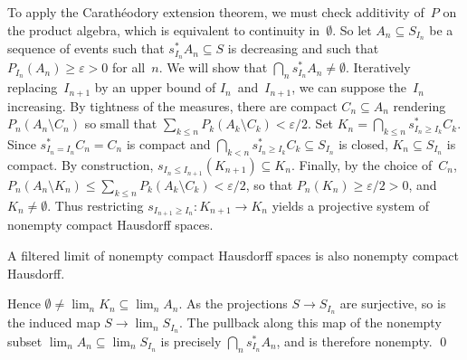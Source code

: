 To apply the Carathéodory extension theorem,
we must check \sig additivity of~$P$ on the product algebra,
which is equivalent to continuity in~$\emptyset$.
So let \( A_n \subseteq S_{I_n} \) be a sequence of events
such that \( s_{I_n}^* A_n \subseteq S \) is decreasing
and such that \( P_{I_n}(A_n) \ge \varepsilon > 0 \) for all~$n$.
We will show that \( \bigcap_n s_{I_n}^* A_n \ne \emptyset \).
Iteratively replacing~$I_{n+1}$ by an upper bound of $I_n$~and~$I_{n+1}$,
we can suppose the~$I_n$ increasing.
By tightness of the measures, there are compact \( C_n \subseteq A_n \)
rendering \( P_n(A_n \setminus C_n) \) so small that
\( \sum_{k \le n} P_k(A_k \setminus C_k) < \varepsilon/2 \).
Set \( K_n = \bigcap_{k \le n} s_{I_n \ge I_k}^* C_k \).
Since \( s_{I_n = I_n}^* C_n = C_n \) is compact
and \( \bigcap_{k < n} s_{I_n \ge I_k}^* C_k \subseteq S_{I_n} \) is closed,
\( K_n \subseteq S_{I_n} \) is compact.
By construction, \( s_{I_n \le I_{n+1}}(K_{n+1}) \subseteq K_n \).
Finally, by the choice of~$C_n$,
\(	P_n( A_n \setminus K_n )
\le	\sum_{k \le n} P_k( A_k \setminus C_k )
<	\varepsilon/2
\), so that \( P_n(K_n) \ge \varepsilon/2 > 0 \),
and \( K_n \ne \emptyset \).
Thus restricting \( s_{I_{n+1} \ge I_n} \colon K_{n+1} \to K_n \)
yields a projective system of nonempty compact Hausdorff spaces.

\begin	{lemma}
A filtered limit of nonempty compact Hausdorff spaces
is also nonempty compact Hausdorff.
\end	{lemma}

Hence \( \emptyset \ne \lim_n K_n \subseteq \lim_n A_n \).
As the projections \( S \to S_{I_n} \) are surjective,
so is the induced map \( S \to \lim_n S_{I_n} \).
The pullback along this map of the nonempty subset
\( \lim_n A_n \subseteq \lim_n S_{I_n} \)
is precisely \( \bigcap_n s_{I_n}^* A_n \),
and is therefore nonempty.
\qed
